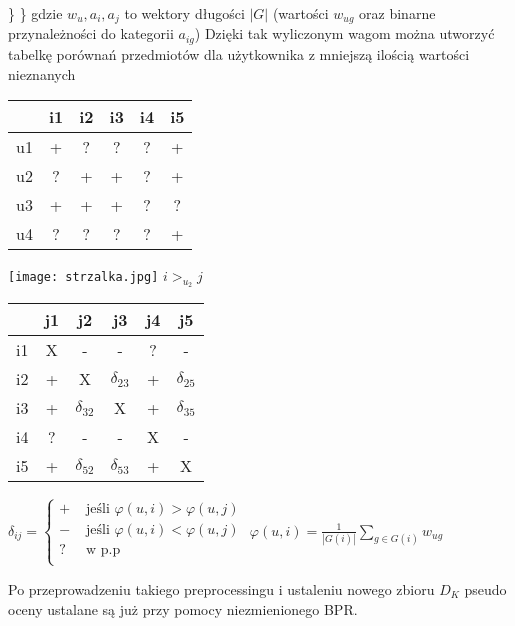 \documentclass{pracamgr}
\begin{document}
     \hspace*{16pt}	\}\newline
     \hspace*{0pt}\}\newline
     {\scriptsize
      gdzie $w_u,a_i,a_j$ to wektory długości $|G|$ (wartości $w_{ug}$ oraz binarne przynależności do kategorii $a_{ig}$)
     }\newline
     Dzięki tak wyliczonym wagom można utworzyć tabelkę porównań przedmiotów dla użytkownika z mniejszą ilością wartości nieznanych\newline
     \begin{multicols}{3}
      \begin{tabular}{c|c|c|c|c|c|}
        & i1 & i2 & i3 & i4 & i5 \\
       \hline
       u1 & + & ? & ? & ? & + \\
       \hline
       u2 & ? & + & + & ? & + \\    
       \hline
       u3 & + & + & + & ? & ? \\
       \hline
       u4 & ? & ? & ? & ? & + \\    
      \end{tabular}
      \begin{center}
       \texttt{[image: strzalka.jpg]}\newline
       $i>_{u_2}j$
      \end{center}
      \begin{tabular}{c|c|c|c|c|c|}
          & j1 & j2 & 		j3 & 		j4 & j5 \\
       \hline
       i1 & X &	- &	 	 - &		 ? & - \\
       \hline
       i2 & + &	X &	 	 $\delta_{23}$ & + & $\delta_{25}$ \\    
       \hline
       i3 & + &	$\delta_{32}$ & X &		 + & $\delta_{35}$ \\    
       \hline
       i4 & ? &	- &	 	 - &		 X & - \\
       \hline
       i5 & + &	$\delta_{52}$ & $\delta_{53}$ & + & X \\ 
      \end{tabular}
     \end{multicols}
     \begin{center}
      $\delta_{ij}=\left\{\begin{array}{cc}
       + &\text{ jeśli } \varphi(u,i)>\varphi(u,j)\\
       - &\text{ jeśli } \varphi(u,i)<\varphi(u,j)\\
       ? &\text{ w p.p }\\
      \end{array}\right.$\quad\quad\quad\quad\quad\quad\quad
      $\varphi(u,i)=\frac{1}{|G(i)|}\sum_{g\in G(i)}w_{ug}$
     \end{center}
     Po przeprowadzeniu takiego preprocessingu i ustaleniu nowego zbioru $D_K$ pseudo oceny ustalane są już przy pomocy niezmienionego BPR.
\end{document}
